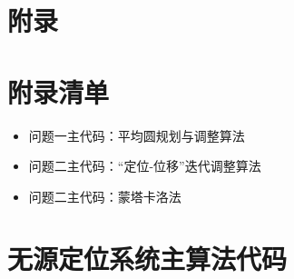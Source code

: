\documentclass[withoutpreface,bwprint]{cumcmthesis} %
\begin{document}
	\section*{附录}
	\appendix
	\section{附录清单}
	\begin{itemize}
		\item 问题一主代码：平均圆规划与调整算法
		\item 问题二主代码：“定位-位移”迭代调整算法
		\item 问题二主代码：蒙塔卡洛法
	\end{itemize}
	\section{无源定位系统主算法代码}
\end{document}
